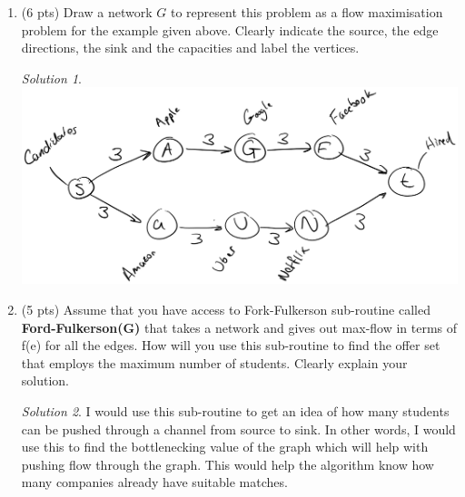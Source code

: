 \documentclass[12pt]{article}
\theoremstyle{remark}
\newtheorem*{solution}{Solution}
\begin{document}
\begin{enumerate}
\begin{enumerate}
    \item (6 pts) Draw a network $G$ to represent this problem as a flow maximisation problem for the example given above. Clearly indicate the source, the edge directions, the sink and the capacities and label the vertices.
\begin{solution}
\includegraphics[scale=0.5]{candidates.png}
\end{solution}
\pagebreak
    
    \item (5 pts) Assume that you have access to Fork-Fulkerson sub-routine called \textbf{Ford-Fulkerson(G)} that takes a network and gives out max-flow in terms of f(e) for all the edges. How will you use this sub-routine to find the offer set that employs the maximum number of students. Clearly explain your solution.

\begin{solution}
I would use this sub-routine to get an idea of how many students can be pushed through a channel from source to sink. In other words, I would use this to find the bottlenecking value of the graph which will help with pushing flow through the graph. This would help the algorithm know how many companies already have suitable matches. 
\end{solution}

\end{enumerate}

\end{enumerate}
\end{document}
